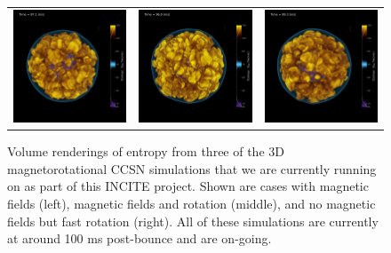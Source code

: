 \documentclass[12pt]{article}
\begin{document}
\begin{figure}[b!]
  \begin{tabular}{ccc}
    \includegraphics[width=2in]{fig_vr_m15u_3d_mag_annotated_0677.png} &
    \includegraphics[width=2in]{fig_vr_m15u_3d_mag_rot_annotated_0695.png} &
    \includegraphics[width=2in]{./fig_vr_m15u_3d_rot2_annotated_0696.png}    
  \end{tabular}
  \caption{Volume renderings of entropy from three of the 3D magnetorotational CCSN simulations that we are currently running on \mira as part of this INCITE project. Shown are cases with magnetic fields (left), magnetic fields and rotation (middle), and no magnetic fields but fast rotation (right). All of these simulations are currently at around 100 ms post-bounce and are on-going.} 
  \label{f.m15u}
\end{figure}
\end{document}
